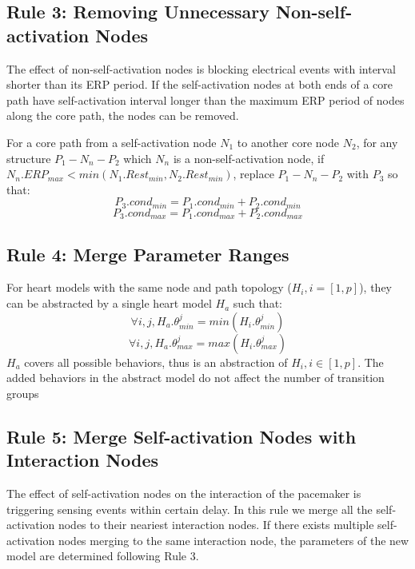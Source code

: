 \subsection{Rule 3: Removing Unnecessary Non-self-activation Nodes}
The effect of non-self-activation nodes is blocking electrical events with interval shorter than its ERP period. If the self-activation nodes at both ends of a core path have self-activation interval longer than the maximum ERP period of nodes along the core path, the nodes can be removed.

For a core path from a self-activation node $N_1$ to another core node $N_2$, for any structure $P_1-N_n-P_2$ which $N_n$ is a non-self-activation node, if $N_n.ERP_{max}<min(N_1.Rest_{min},N_2.Rest_{min})$, replace $P_1-N_n-P_2$ with $P_3$ so that:
$$P_3.cond_{min}=P_1.cond_{min}+P_2.cond_{min}$$
$$P_3.cond_{max}=P_1.cond_{max}+P_2.cond_{max}$$
\subsection{Rule 4: Merge Parameter Ranges}
For heart models with the same node and path topology ($H_i,i=[1,p]$), they can be abstracted by a single heart model $H_a$ such that:
$$\forall i,j,H_a.\theta^j_{min}=min(H_i.\theta^j_{min})$$ 
$$\forall i,j,H_a.\theta^j_{max}=max(H_i.\theta^j_{max})$$ 
$H_a$ covers all possible behaviors, thus is an abstraction of $H_i, i\in [1,p]$. The added behaviors in the abstract model do not affect the number of transition groups
%
%
%

\subsection{Rule 5: Merge Self-activation Nodes with Interaction Nodes}
The effect of self-activation nodes on the interaction of the pacemaker is triggering sensing events within certain delay. In this rule we merge all the self-activation nodes to their neariest interaction nodes. If there exists multiple self-activation nodes merging to the same interaction node, the parameters of the new model are determined following Rule 3.

